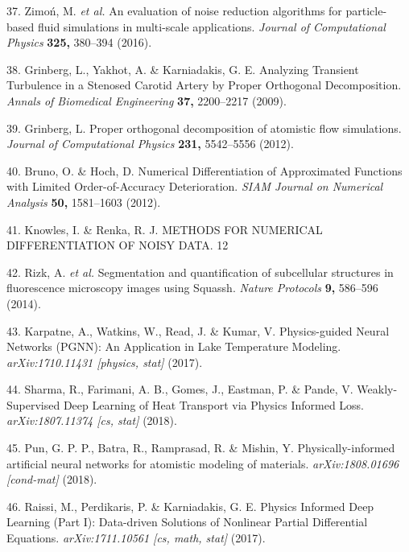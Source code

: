 \documentclass{Dissertate}
\begin{document}
\leavevmode\hypertarget{ref-zimon_evaluation_2016}{}%
37. Zimoń, M. \emph{et al.} An evaluation of noise reduction algorithms
for particle-based fluid simulations in multi-scale applications.
\emph{Journal of Computational Physics} \textbf{325,} 380--394 (2016).

\leavevmode\hypertarget{ref-grinberg_analyzing_2009}{}%
38. Grinberg, L., Yakhot, A. \& Karniadakis, G. E. Analyzing Transient
Turbulence in a Stenosed Carotid Artery by Proper Orthogonal
Decomposition. \emph{Annals of Biomedical Engineering} \textbf{37,}
2200--2217 (2009).

\leavevmode\hypertarget{ref-grinberg_proper_2012}{}%
39. Grinberg, L. Proper orthogonal decomposition of atomistic flow
simulations. \emph{Journal of Computational Physics} \textbf{231,}
5542--5556 (2012).

\leavevmode\hypertarget{ref-bruno_numerical_2012}{}%
40. Bruno, O. \& Hoch, D. Numerical Differentiation of Approximated
Functions with Limited Order-of-Accuracy Deterioration. \emph{SIAM
Journal on Numerical Analysis} \textbf{50,} 1581--1603 (2012).

\leavevmode\hypertarget{ref-knowles_methods_nodate}{}%
41. Knowles, I. \& Renka, R. J. METHODS FOR NUMERICAL DIFFERENTIATION OF
NOISY DATA. 12

\leavevmode\hypertarget{ref-rizk_segmentation_2014}{}%
42. Rizk, A. \emph{et al.} Segmentation and quantification of
subcellular structures in fluorescence microscopy images using Squassh.
\emph{Nature Protocols} \textbf{9,} 586--596 (2014).

\leavevmode\hypertarget{ref-karpatne_physics-guided_2017}{}%
43. Karpatne, A., Watkins, W., Read, J. \& Kumar, V. Physics-guided
Neural Networks (PGNN): An Application in Lake Temperature Modeling.
\emph{arXiv:1710.11431 {[}physics, stat{]}} (2017).

\leavevmode\hypertarget{ref-sharma_weakly-supervised_2018}{}%
44. Sharma, R., Farimani, A. B., Gomes, J., Eastman, P. \& Pande, V.
Weakly-Supervised Deep Learning of Heat Transport via Physics Informed
Loss. \emph{arXiv:1807.11374 {[}cs, stat{]}} (2018).

\leavevmode\hypertarget{ref-pun_physically-informed_2018}{}%
45. Pun, G. P. P., Batra, R., Ramprasad, R. \& Mishin, Y.
Physically-informed artificial neural networks for atomistic modeling of
materials. \emph{arXiv:1808.01696 {[}cond-mat{]}} (2018).

\leavevmode\hypertarget{ref-raissi_physics_2017-1}{}%
46. Raissi, M., Perdikaris, P. \& Karniadakis, G. E. Physics Informed
Deep Learning (Part I): Data-driven Solutions of Nonlinear Partial
Differential Equations. \emph{arXiv:1711.10561 {[}cs, math, stat{]}}
(2017).
\end{document}
